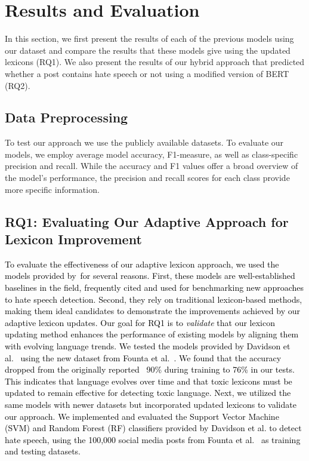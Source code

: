 \section{Results and Evaluation}

In this section, we first present the results of each of the previous models using our dataset and compare the results that these models give using the updated lexicons (RQ1).
We also present the results of our hybrid approach that predicted whether a post contains hate speech or not using a modified version of BERT (RQ2). 

\subsection{Data Preprocessing}
To test our approach we use the publicly available datasets. To evaluate our models, we employ average model accuracy, F1-measure, as well as class-specific precision and recall.
While the accuracy and F1 values offer a broad overview of the model's performance, the precision and recall scores for each class provide more specific information.

\subsection{RQ1: Evaluating Our Adaptive Approach for Lexicon Improvement}
\textcolor{black}{To evaluate the effectiveness of our adaptive lexicon approach, we used the models provided by~\citeauthor{davidson2017automated}\cite{davidson2017automated}for several reasons. First, these models are well-established baselines in the field, frequently cited and used for benchmarking new approaches to hate speech detection. Second, they rely on traditional lexicon-based methods, making them ideal candidates to demonstrate the improvements achieved by our adaptive lexicon updates. Our goal for RQ1 is to \textit{validate} that our lexicon updating method enhances the performance of existing models by aligning them with evolving language trends.
We tested the models provided by Davidson et al.~\cite{davidson2017automated} using the new dataset from Founta et al.~\cite{founta2018large}. We found that the accuracy dropped from the originally reported ~90\% during training to 76\% in our tests. This indicates that language evolves over time and that toxic lexicons must be updated to remain effective for detecting toxic language. Next, we utilized the same models with newer datasets but incorporated updated lexicons to validate our approach. We implemented and evaluated the Support Vector Machine (SVM) and Random Forest (RF) classifiers provided by Davidson et al. to detect hate speech, using the 100,000 social media posts from Founta et al.~\cite{founta2018large} as training and testing datasets.}

